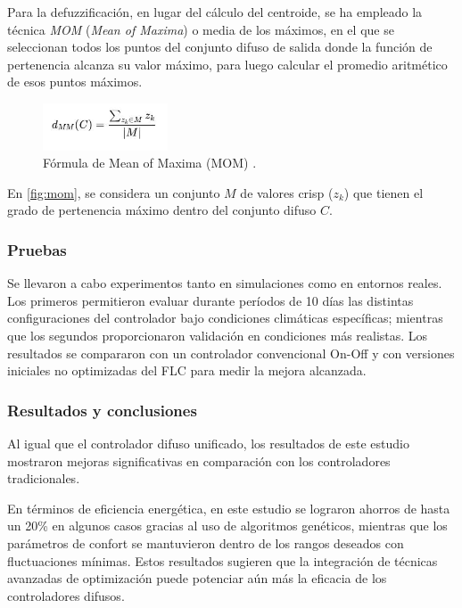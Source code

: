 Para la defuzzificación, en lugar del cálculo del centroide, se ha empleado la técnica \textit{MOM} (\textit{Mean of Maxima}) o media de los máximos, en el que se seleccionan todos los puntos del conjunto difuso de salida donde la función de pertenencia alcanza su valor máximo, para luego calcular el promedio aritmético de esos puntos máximos.

\begin{figure}[H]
	\centering
	\includegraphics[width=0.33\textwidth]{imgs/mom.JPG}
	\caption{Fórmula de Mean of Maxima (MOM) \parencite{klir1996fuzzy}.}
	\label{fig:mom}
\end{figure}

En \autoref{fig:mom}, se considera un conjunto $M$ de valores crisp ($z_k$) que tienen el grado de pertenencia máximo dentro del conjunto difuso $C$. 

\subsubsection{Pruebas}

Se llevaron a cabo experimentos tanto en simulaciones como en entornos reales. Los primeros permitieron evaluar durante períodos de 10 días las distintas configuraciones del controlador bajo condiciones climáticas específicas; mientras que los segundos proporcionaron validación en condiciones más realistas. Los resultados se compararon con un controlador convencional On-Off y con versiones iniciales no optimizadas del FLC para medir la mejora alcanzada.

\subsubsection{Resultados y conclusiones}

Al igual que el controlador difuso unificado, los resultados de este estudio mostraron mejoras significativas en comparación con los controladores tradicionales.

En términos de eficiencia energética, en este estudio se lograron ahorros de hasta un 20\% en algunos casos gracias al uso de algoritmos genéticos, mientras que los parámetros de confort se mantuvieron dentro de los rangos deseados con fluctuaciones mínimas. Estos resultados sugieren que la integración de técnicas avanzadas de optimización puede potenciar aún más la eficacia de los controladores difusos.

